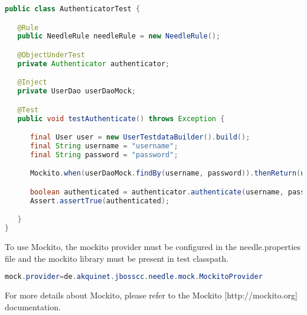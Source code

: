 \begin{lstlisting}[language={JAVA},caption=Testing with Mockito]
public class AuthenticatorTest {

   @Rule
   public NeedleRule needleRule = new NeedleRule();

   @ObjectUnderTest
   private Authenticator authenticator;

   @Inject
   private UserDao userDaoMock;

   @Test
   public void testAuthenticate() throws Exception {

      final User user = new UserTestdataBuilder().build();
      final String username = "username";
      final String password = "password";

      Mockito.when(userDaoMock.findBy(username, password)).thenReturn(user);

      boolean authenticated = authenticator.authenticate(username, password);
      Assert.assertTrue(authenticated);

   }
}

\end{lstlisting}

To use Mockito, the mockito provider must be configured in the needle.properties file and the mockito library must be present in test classpath.

\begin{lstlisting}[language={JAVA},caption=Mockito configuration]
mock.provider=de.akquinet.jbosscc.needle.mock.MockitoProvider
\end{lstlisting}

For more details about Mockito, please refer to the Mockito [http://mockito.org] documentation.

